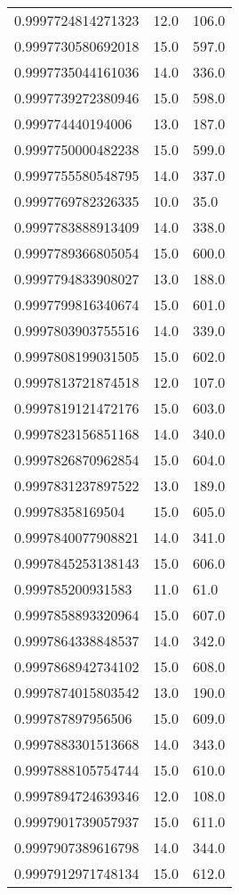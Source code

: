 \begin{center}
\begin{supertabular}[H]{p{0.30\textwidth}p{0.05\textwidth}p{0.05\textwidth}}
0.9997724814271323 & 12.0 & 106.0 \\ 
0.9997730580692018 & 15.0 & 597.0 \\ 
0.9997735044161036 & 14.0 & 336.0 \\ 
0.9997739272380946 & 15.0 & 598.0 \\ 
0.999774440194006 & 13.0 & 187.0 \\ 
0.9997750000482238 & 15.0 & 599.0 \\ 
0.9997755580548795 & 14.0 & 337.0 \\ 
0.9997769782326335 & 10.0 & 35.0 \\ 
0.9997783888913409 & 14.0 & 338.0 \\ 
0.9997789366805054 & 15.0 & 600.0 \\ 
0.9997794833908027 & 13.0 & 188.0 \\ 
0.9997799816340674 & 15.0 & 601.0 \\ 
0.9997803903755516 & 14.0 & 339.0 \\ 
0.9997808199031505 & 15.0 & 602.0 \\ 
0.9997813721874518 & 12.0 & 107.0 \\ 
0.9997819121472176 & 15.0 & 603.0 \\ 
0.9997823156851168 & 14.0 & 340.0 \\ 
0.9997826870962854 & 15.0 & 604.0 \\ 
0.9997831237897522 & 13.0 & 189.0 \\ 
0.99978358169504 & 15.0 & 605.0 \\ 
0.9997840077908821 & 14.0 & 341.0 \\ 
0.9997845253138143 & 15.0 & 606.0 \\ 
0.999785200931583 & 11.0 & 61.0 \\ 
0.9997858893320964 & 15.0 & 607.0 \\ 
0.9997864338848537 & 14.0 & 342.0 \\ 
0.9997868942734102 & 15.0 & 608.0 \\ 
0.9997874015803542 & 13.0 & 190.0 \\ 
0.999787897956506 & 15.0 & 609.0 \\ 
0.9997883301513668 & 14.0 & 343.0 \\ 
0.9997888105754744 & 15.0 & 610.0 \\ 
0.9997894724639346 & 12.0 & 108.0 \\ 
0.9997901739057937 & 15.0 & 611.0 \\ 
0.9997907389616798 & 14.0 & 344.0 \\ 
0.9997912971748134 & 15.0 & 612.0 \\ 

\end{supertabular}
\end{center}
